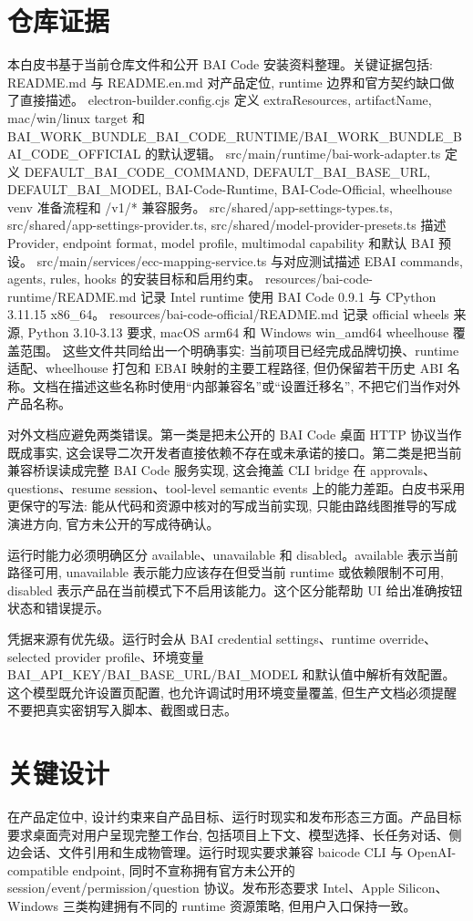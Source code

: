 \section{仓库证据}
本白皮书基于当前仓库文件和公开 BAI Code 安装资料整理。关键证据包括: README.md 与 README.en.md 对产品定位, runtime 边界和官方契约缺口做了直接描述。 electron-builder.config.cjs 定义 extraResources, artifactName, mac/win/linux target 和 BAI\_WORK\_BUNDLE\_BAI\_CODE\_RUNTIME/BAI\_WORK\_BUNDLE\_BAI\_CODE\_OFFICIAL 的默认逻辑。 src/main/runtime/bai-work-adapter.ts 定义 DEFAULT\_BAI\_CODE\_COMMAND, DEFAULT\_BAI\_BASE\_URL, DEFAULT\_BAI\_MODEL, BAI-Code-Runtime, BAI-Code-Official, wheelhouse venv 准备流程和 /v1/* 兼容服务。 src/shared/app-settings-types.ts, src/shared/app-settings-provider.ts, src/shared/model-provider-presets.ts 描述 Provider, endpoint format, model profile, multimodal capability 和默认 BAI 预设。 src/main/services/ecc-mapping-service.ts 与对应测试描述 EBAI commands, agents, rules, hooks 的安装目标和启用约束。 resources/bai-code-runtime/README.md 记录 Intel runtime 使用 BAI Code 0.9.1 与 CPython 3.11.15 x86\_64。 resources/bai-code-official/README.md 记录 official wheels 来源, Python 3.10-3.13 要求, macOS arm64 和 Windows win\_amd64 wheelhouse 覆盖范围。 这些文件共同给出一个明确事实: 当前项目已经完成品牌切换、runtime 适配、wheelhouse 打包和 EBAI 映射的主要工程路径, 但仍保留若干历史 ABI 名称。文档在描述这些名称时使用“内部兼容名”或“设置迁移名”, 不把它们当作对外产品名称。

对外文档应避免两类错误。第一类是把未公开的 BAI Code 桌面 HTTP 协议当作既成事实, 这会误导二次开发者直接依赖不存在或未承诺的接口。第二类是把当前兼容桥误读成完整 BAI Code 服务实现, 这会掩盖 CLI bridge 在 approvals、questions、resume session、tool-level semantic events 上的能力差距。白皮书采用更保守的写法: 能从代码和资源中核对的写成当前实现, 只能由路线图推导的写成演进方向, 官方未公开的写成待确认。

运行时能力必须明确区分 available、unavailable 和 disabled。available 表示当前路径可用, unavailable 表示能力应该存在但受当前 runtime 或依赖限制不可用, disabled 表示产品在当前模式下不启用该能力。这个区分能帮助 UI 给出准确按钮状态和错误提示。

凭据来源有优先级。运行时会从 BAI credential settings、runtime override、selected provider profile、环境变量 BAI\_API\_KEY/BAI\_BASE\_URL/BAI\_MODEL 和默认值中解析有效配置。这个模型既允许设置页配置, 也允许调试时用环境变量覆盖, 但生产文档必须提醒不要把真实密钥写入脚本、截图或日志。

\section{关键设计}
在产品定位中, 设计约束来自产品目标、运行时现实和发布形态三方面。产品目标要求桌面壳对用户呈现完整工作台, 包括项目上下文、模型选择、长任务对话、侧边会话、文件引用和生成物管理。运行时现实要求兼容 baicode CLI 与 OpenAI-compatible endpoint, 同时不宣称拥有官方未公开的 session/event/permission/question 协议。发布形态要求 Intel、Apple Silicon、Windows 三类构建拥有不同的 runtime 资源策略, 但用户入口保持一致。

